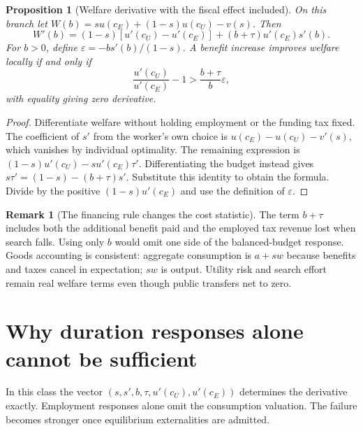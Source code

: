 \documentclass[11pt]{article}
\newtheorem{proposition}{Proposition}
\theoremstyle{definition}
\newtheorem{remark}{Remark}
\begin{document}
\begin{proposition}[Welfare derivative with the fiscal effect included]
On this branch let $W(b)=s u(c_E)+(1-s)u(c_U)-v(s)$. Then
\[
 W'(b)=(1-s)[u'(c_U)-u'(c_E)]
                  +(b+\tau)u'(c_E)s'(b).
\]
For $b>0$, define $\varepsilon=-b s'(b)/(1-s)$. A benefit increase improves welfare locally if and only if
\[
 \frac{u'(c_U)}{u'(c_E)}-1
     >\frac{b+\tau}{b}\varepsilon,
\]
with equality giving zero derivative.
\end{proposition}
\begin{proof}
Differentiate welfare without holding employment or the funding tax fixed. The coefficient of $s'$ from the worker's own choice is $u(c_E)-u(c_U)-v'(s)$, which vanishes by individual optimality. The remaining expression is $(1-s)u'(c_U)-s u'(c_E)\tau'$. Differentiating the budget instead gives $s\tau'=(1-s)-(b+\tau)s'$. Substitute this identity to obtain the formula. Divide by the positive $(1-s)u'(c_E)$ and use the definition of $\varepsilon$.
\end{proof}

\begin{remark}[The financing rule changes the cost statistic]
The term $b+\tau$ includes both the additional benefit paid and the employed tax revenue lost when search falls. Using only $b$ would omit one side of the balanced-budget response. Goods accounting is consistent: aggregate consumption is $a+sw$ because benefits and taxes cancel in expectation; $sw$ is output. Utility risk and search effort remain real welfare terms even though public transfers net to zero.
\end{remark}

\section*{Why duration responses alone cannot be sufficient}
In this class the vector $(s,s',b,\tau,u'(c_U),u'(c_E))$ determines the derivative exactly. Employment responses alone omit the consumption valuation. The failure becomes stronger once equilibrium externalities are admitted.
\end{document}
